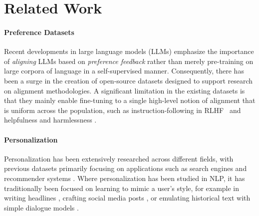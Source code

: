 \section{Related Work}


\paragraph{Preference Datasets}
Recent developments in large language models (LLMs) emphasize the importance of \emph{aligning} LLMs based on \emph{preference feedback} rather than merely pre-training on large corpora of language in a self-supervised manner. 
Consequently, there has been a surge in the creation of open-source datasets \citep{bai2022training, nakano2022webgpt, köpf2023openassistant, dubois2024alpacafarm, lambert2024rewardbench} designed to support research on alignment methodologies. A significant limitation in the existing datasets is that they mainly enable fine-tuning to a single high-level notion of alignment that is uniform across the population, such as instruction-following in RLHF~\citep{ouyang2022training} and helpfulness and harmlessness \citep{bai2022training}. 

\paragraph{Personalization}

Personalization has been extensively researched across different fields, with previous datasets primarily focusing on applications such as search engines and recommender systems \citep{davidson2010youtube, das2007google, Xu_2022, F_rber_2020}. 
Where personalization has been studied in NLP, it has traditionally been focused on learning to mimic a user's style, for example in writing headlines \citep{ao-etal-2021-pens}, crafting social media posts \citep{mazare-etal-2018-training}, or emulating historical text with simple dialogue models \citep{wu-etal-2021-personalized}.


